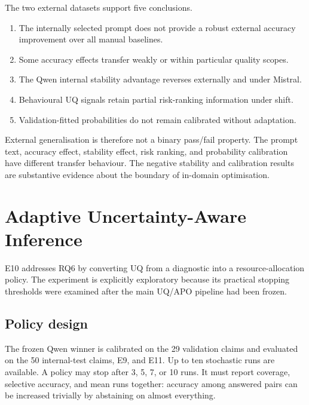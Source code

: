 \documentclass[11pt,twoside,a4paper]{report}
\begin{document}
The two external datasets support five conclusions.

\begin{enumerate}
  \item The internally selected prompt does not provide a robust external accuracy
  improvement over all manual baselines.
  \item Some accuracy effects transfer weakly or within particular quality scopes.
  \item The Qwen internal stability advantage reverses externally and under Mistral.
  \item Behavioural UQ signals retain partial risk-ranking information under shift.
  \item Validation-fitted probabilities do not remain calibrated without adaptation.
\end{enumerate}

External generalisation is therefore not a binary pass/fail property.  The prompt
text, accuracy effect, stability effect, risk ranking, and probability calibration
have different transfer behaviour.  The negative stability and calibration results
are substantive evidence about the boundary of in-domain optimisation.

\chapter{Adaptive Uncertainty-Aware Inference}
\label{chap:adaptive}

E10 addresses RQ6 by converting UQ from a diagnostic into a resource-allocation
policy.  The experiment is explicitly exploratory because its practical stopping
thresholds were examined after the main UQ/APO pipeline had been frozen.

\section{Policy design}

The frozen Qwen winner is calibrated on the 29 validation claims and evaluated on
the 50 internal-test claims, E9, and E11.  Up to ten stochastic runs are available.
A policy may stop after 3, 5, 7, or 10 runs.  It must report coverage, selective
accuracy, and mean runs together: accuracy among answered pairs can be increased
trivially by abstaining on almost everything.
\end{document}
